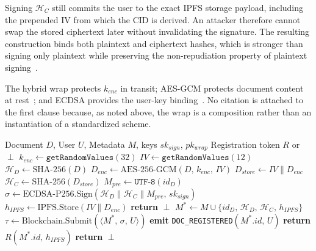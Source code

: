 \documentclass[preprint,12pt]{elsarticle}
\begin{document}
Signing $\mathcal{H}_C$ still commits the user to the exact IPFS storage payload, including the prepended IV from which the CID is derived. An attacker therefore cannot swap the stored ciphertext later without invalidating the signature. The resulting construction binds both plaintext and ciphertext hashes, which is stronger than signing only plaintext while preserving the non-repudiation property of plaintext signing~\cite{fips1865,ieee1363a2004}.

The hybrid wrap protects $k_{enc}$ in transit; AES-GCM protects document content at rest~\cite{fips197}; and ECDSA provides the user-key binding~\cite{fips1865}. No citation is attached to the first clause because, as noted above, the wrap is a composition rather than an instantiation of a standardized scheme.

\begin{algorithm}[H]
\caption{Document Registration (Sign-Then-Store Pattern)}
\label{alg:doc_registration}
\small
\begin{algorithmic}[1]
\REQUIRE Document $D$, User $U$, Metadata $M$, keys $sk_{sign}$,
         $pk_{wrap}$
\ENSURE Registration token $R$ or $\perp$
\STATE $k_{enc} \leftarrow \texttt{getRandomValues}(32)$
\STATE $\mathit{IV} \leftarrow \texttt{getRandomValues}(12)$
\STATE $\mathcal{H}_D \leftarrow \text{SHA-256}(D)$
\STATE $D_{enc} \leftarrow \text{AES-256-GCM}(D,\,k_{enc},\,\mathit{IV})$
\STATE $D_{store} \leftarrow \mathit{IV} \| D_{enc}$
\STATE $\mathcal{H}_C \leftarrow \text{SHA-256}(D_{store})$
\STATE $M_{pre} \leftarrow \texttt{UTF-8}(id_D)$
\STATE $\sigma \leftarrow \text{ECDSA-P256.Sign}(\mathcal{H}_D \| \mathcal{H}_C \|
       M_{pre},\,sk_{sign})$
\STATE $h_{IPFS} \leftarrow \text{IPFS.Store}(\mathit{IV} \| D_{enc})$
    \STATE \textbf{return} $\perp$
\ENDIF
\STATE $M^* \leftarrow M \cup \{id_D,\,\mathcal{H}_D,\,\mathcal{H}_C,\,h_{IPFS}\}$
\STATE $\tau \leftarrow \text{Blockchain.Submit}(\langle M^*,\,\sigma,\,
       U \rangle)$
    \STATE \textbf{emit} \texttt{DOC\_REGISTERED}$(M^*.id,\,U)$
    \STATE \textbf{return} $R(M^*.id,\,h_{IPFS})$
\ELSE
    \STATE \textbf{return} $\perp$
\ENDIF
\end{algorithmic}
\end{algorithm}
\end{document}

